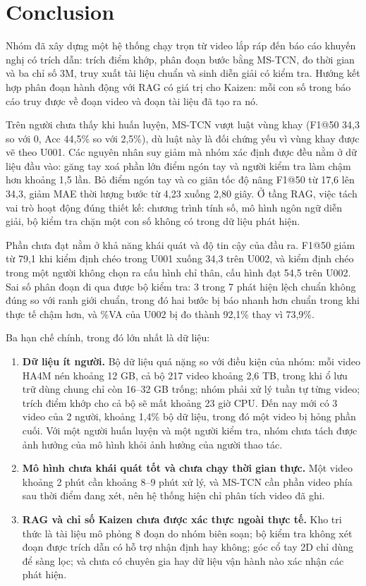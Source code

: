 \section{Conclusion}

Nhóm đã xây dựng một hệ thống chạy trọn từ video lắp ráp đến báo cáo khuyến nghị có trích dẫn: trích điểm khớp, phân đoạn bước bằng MS-TCN, đo thời gian và ba chỉ số 3M, truy xuất tài liệu chuẩn và sinh diễn giải có kiểm tra. Hướng kết hợp phân đoạn hành động với RAG có giá trị cho Kaizen: mỗi con số trong báo cáo truy được về đoạn video và đoạn tài liệu đã tạo ra nó.

Trên người chưa thấy khi huấn luyện, MS-TCN vượt luật vùng khay (F1@50 34,3 so với 0, Acc 44,5\% so với 2,5\%), dù luật này là đối chứng yếu vì vùng khay được vẽ theo U001. Các nguyên nhân suy giảm mà nhóm xác định được đều nằm ở dữ liệu đầu vào: găng tay xoá phần lớn điểm ngón tay và người kiểm tra làm chậm hơn khoảng 1,5 lần. Bỏ điểm ngón tay và co giãn tốc độ nâng F1@50 từ 17,6 lên 34,3, giảm MAE thời lượng bước từ 4,23 xuống 2,80 giây. Ở tầng RAG, việc tách vai trò hoạt động đúng thiết kế: chương trình tính số, mô hình ngôn ngữ diễn giải, bộ kiểm tra chặn một con số không có trong dữ liệu phát hiện.

Phần chưa đạt nằm ở khả năng khái quát và độ tin cậy của đầu ra. F1@50 giảm từ 79,1 khi kiểm định chéo trong U001 xuống 34,3 trên U002, và kiểm định chéo trong một người không chọn ra cấu hình chỉ thân, cấu hình đạt 54,5 trên U002. Sai số phân đoạn đi qua được bộ kiểm tra: 3 trong 7 phát hiện lệch chuẩn không đúng so với ranh giới chuẩn, trong đó hai bước bị báo nhanh hơn chuẩn trong khi thực tế chậm hơn, và \%VA của U002 bị đo thành 92,1\% thay vì 73,9\%.

Ba hạn chế chính, trong đó lớn nhất là dữ liệu:
\begin{enumerate}\setlength{\itemsep}{1pt}
\item \textbf{Dữ liệu ít người.} Bộ dữ liệu quá nặng so với điều kiện của nhóm: mỗi video HA4M nén khoảng 12 GB, cả bộ 217 video khoảng 2,6 TB, trong khi ổ lưu trữ dùng chung chỉ còn 16–32 GB trống; nhóm phải xử lý tuần tự từng video; trích điểm khớp cho cả bộ sẽ mất khoảng 23 giờ CPU. Đến nay mới có 3 video của 2 người, khoảng 1,4\% bộ dữ liệu, trong đó một video bị hỏng phần cuối. Với một người huấn luyện và một người kiểm tra, nhóm chưa tách được ảnh hưởng của mô hình khỏi ảnh hưởng của người thao tác.
\item \textbf{Mô hình chưa khái quát tốt và chưa chạy thời gian thực.} Một video khoảng 2 phút cần khoảng 8–9 phút xử lý, và MS-TCN cần phần video phía sau thời điểm đang xét, nên hệ thống hiện chỉ phân tích video đã ghi.
\item \textbf{RAG và chỉ số Kaizen chưa được xác thực ngoài thực tế.} Kho tri thức là tài liệu mô phỏng 8 đoạn do nhóm biên soạn; bộ kiểm tra không xét đoạn được trích dẫn có hỗ trợ nhận định hay không; góc cổ tay 2D chỉ dùng để sàng lọc; và chưa có chuyên gia hay dữ liệu vận hành nào xác nhận các phát hiện.
\end{enumerate}

